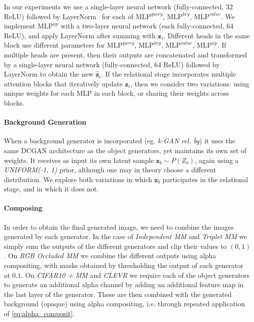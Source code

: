 \documentclass{article}
\begin{document}
In our experiments we use a single-layer neural network (fully-connected, 32 ReLU) followed by LayerNorm~\citep{ba2016layer} for each of $\text{MLP}^{\textit{query}}$, $\text{MLP}^{\textit{key}}$, $\text{MLP}^{\textit{value}}$.
We implement $\text{MLP}^{\textit{up}}$ with a two-layer neural network (each fully-connected, 64 ReLU), and apply LayerNorm after summing with $\bm{z}_i$.
Different heads in the same block use different parameters for $\text{MLP}^{\textit{query}}$, $\text{MLP}^{\textit{key}}$, $\text{MLP}^{\textit{value}}$, $\text{MLP}^{\textit{up}}$.
If multiple heads are present, then their outputs are concatenated and transformed by a single-layer neural network (fully-connected, 64 ReLU) followed by LayerNorm to obtain the new $\bm{\hat{z}}_i$.
If the relational stage incorporates multiple attention blocks that iteratively update $\bm{z}_i$, then we consider two variations: using unique weights for each MLP in each block, or sharing their weights across blocks.

\paragraph{Background Generation}
When a background generator is incorporated (eg. \emph{k-GAN rel. bg}) it uses the same DCGAN architecture as the object generators, yet maintains its own set of weights. 
It receives as input its own latent sample $\bm{z}_b \sim P(Z_b)$, again using a \emph{UNIFORM(-1, 1)} prior, although one may in theory choose a different distribution.
We explore both variations in which $\bm{z}_b$ participates in the relational stage, and in which it does not. 

\paragraph{Composing} In order to obtain the final generated image, we need to combine the images generated by each generator.
In the case of \emph{Independent MM} and \emph{Triplet MM} we simply sum the outputs of the different generators and clip their values to $(0, 1)$.
On \emph{RGB Occluded MM} we combine the different outputs using alpha compositing, with masks obtained by thresholding the output of each generator at $0.1$.
On \emph{CIFAR10 + MM} and \emph{CLEVR} we require each of the object generators to generate an additional alpha channel by adding an additional feature map in the last layer of the generator.
These are then combined with the generated background (opaque) using alpha compositing, i.e. through repeated application of \eqref{eq:alpha_composit}.
\end{document}
